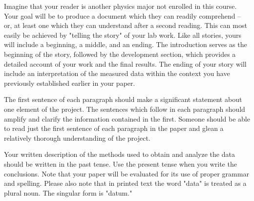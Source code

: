     Imagine that your reader is another physics major not enrolled in this course. Your goal will be to produce a document which they can readily comprehend -- or, at least one which they can understand after a second reading. This can most easily be achieved by "telling the story" of your lab work. Like all stories, yours will include a beginning, a middle, and an ending. The introduction serves as the beginning of the story, followed by the development section, which provides a detailed account of your work and the final results. The ending of your story will include an interpretation of the measured data within the context you have previously established earlier in your paper.

    The first sentence of each paragraph should make a significant statement about one element of the project. The sentences which follow in each paragraph should amplify and clarify the information contained in the first. Someone should be able to read just the first sentence of each paragraph in the paper and glean a relatively thorough understanding of the project.
    
    Your written description of the methods used to obtain and analyze the data should be written in the past tense. Use the present tense when you write the conclusions. Note that your paper will be evaluated for its use of proper grammar and spelling. Please also note that in printed text the word "data" is treated as a plural noun. The singular form is "datum."